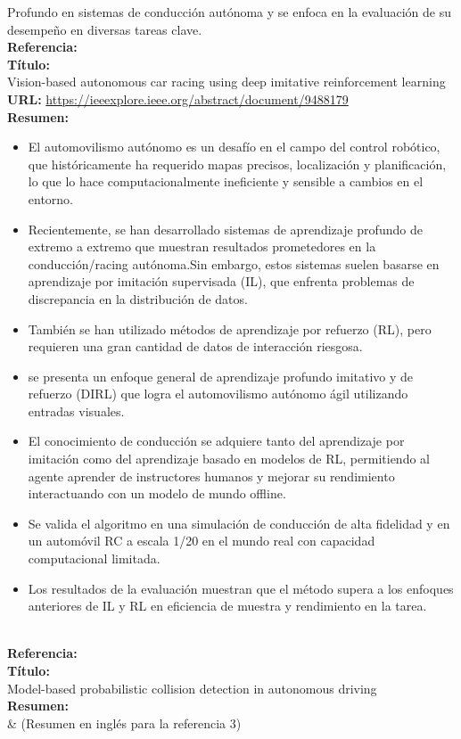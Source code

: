 \documentclass[10pt,letterpaper,final]{article}
\begin{document}
\begin{longtable}
        Profundo en sistemas de conducción autónoma y se enfoca en la evaluación de su desempeño en diversas tareas clave. \\
        \pagebreak
        \hline
        \noindent \textbf{Referencia:}~\cite{althoff2009model} \\
        \textbf{Título:} \\
        Vision-based autonomous car racing using deep imitative reinforcement learning \\
        \textbf{URL:}
        \url{https://ieeexplore.ieee.org/abstract/document/9488179} \\
        \textbf{Resumen:}
        \begin{itemize}
            \item El automovilismo autónomo es un desafío en el campo del control robótico, que históricamente ha requerido mapas precisos,
            localización y planificación, lo que lo hace computacionalmente ineficiente y sensible a cambios en el entorno.
            \item  Recientemente, se han desarrollado sistemas de aprendizaje profundo de extremo a extremo que muestran resultados prometedores
            en la conducción/racing autónoma.Sin embargo, estos sistemas suelen basarse en aprendizaje por imitación supervisada (IL),
            que enfrenta problemas de discrepancia en la distribución de datos.
            \item También se han utilizado métodos de aprendizaje por refuerzo (RL), pero requieren una gran cantidad de datos de interacción riesgosa.
            \item se presenta un enfoque general de aprendizaje profundo imitativo y de refuerzo (DIRL) que logra el automovilismo
            autónomo ágil utilizando entradas visuales.
            \item El conocimiento de conducción se adquiere tanto del aprendizaje por imitación como del aprendizaje basado en modelos de RL,
            permitiendo al agente aprender de instructores humanos y mejorar su rendimiento interactuando con un modelo de mundo offline.
            \item Se valida el algoritmo en una simulación de conducción de alta fidelidad y en un automóvil RC a escala 1/20
            en el mundo real con capacidad computacional limitada.
            \item  Los resultados de la evaluación muestran que el método supera a los enfoques anteriores de IL y RL en eficiencia
            de muestra y rendimiento en la tarea.
        \end{itemize} \\
        \hline
        \pagebreak
        \hline
        \noindent \textbf{Referencia:}~\cite{bachute2021autonomous} \\
        \textbf{Título:} \\
        Model-based probabilistic collision detection in autonomous driving \\
        \textbf{Resumen:} \\
        & (Resumen en inglés para la referencia 3)      \\


\end{longtable}
\end{document}
